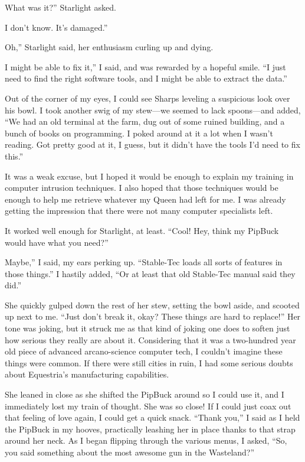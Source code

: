 \leavevmode{}What was it?” Starlight asked.

\leavevmode{}I don’t know. It’s damaged.”

\leavevmode{}Oh,” Starlight said, her enthusiasm curling up and dying.

\leavevmode{}I might be able to fix it,” I said, and was rewarded by a hopeful smile. “I just need to find the right software tools, and I might be able to extract the data.”

Out of the corner of my eyes, I could see Sharps leveling a suspicious look over his bowl. I took another swig of my stew—we seemed to lack spoons—and added, “We had an old terminal at the farm, dug out of some ruined building, and a bunch of books on programming. I poked around at it a lot when I wasn’t reading. Got pretty good at it, I guess, but it didn’t have the tools I’d need to fix this.”

It was a weak excuse, but I hoped it would be enough to explain my training in computer intrusion techniques. I also hoped that those techniques would be enough to help me retrieve whatever my Queen had left for me. I was already getting the impression that there were not many computer specialists left.

It worked well enough for Starlight, at least. “Cool! Hey, think my PipBuck would have what you need?”

\leavevmode{}Maybe,” I said, my ears perking up. “Stable-Tec loads all sorts of features in those things.” I hastily added, “Or at least that old Stable-Tec manual said they did.”

She quickly gulped down the rest of her stew, setting the bowl aside, and scooted up next to me. “Just don’t break it, okay? These things are hard to replace!” Her tone was joking, but it struck me as that kind of joking one does to soften just how serious they really are about it. Considering that it was a two-hundred year old piece of advanced arcano-science computer tech, I couldn’t imagine these things were common. If there were still cities in ruin, I had some serious doubts about Equestria’s manufacturing capabilities.

She leaned in close as she shifted the PipBuck around so I could use it, and I immediately lost my train of thought. She was so close! If I could just coax out that feeling of love again, I could get a quick snack. “Thank you,” I said as I held the PipBuck in my hooves, practically leashing her in place thanks to that strap around her neck. As I began flipping through the various menus, I asked, “So, you said something about the most awesome gun in the Wasteland?”

